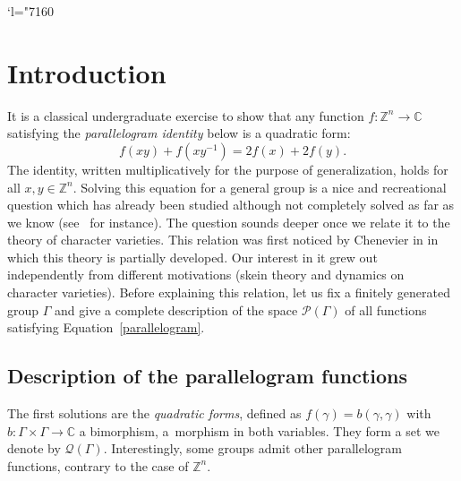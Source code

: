 \documentclass[JEP,XML,SOM,Unicode,NoEqCountersInSection]{cedram}
\let\mathcal\mathscr
\newcommand{\Changel}{\mathcode`l="7160}
\theoremstyle{definition}
\newcommand{\ZZ}{\mathbb{Z}}
\newcommand{\CC}{\mathbb{C}}
\begin{document}
\maketitle
\vspace*{-\baselineskip}
\tableofcontents
\mainmatter
\Changel

\section{Introduction}

It is a classical undergraduate
exercise to show that any function
$f:\ZZ^n\to \CC$ satisfying the {\em parallelogram identity} below is a quadratic form:
\begin{equation}\label{parallelogram}
f(xy)+f(xy^{-1})=2f(x)+2f(y).
\end{equation}
The identity, written multiplicatively for the purpose of generalization,
holds for all $x,y\in \ZZ^n$.
Solving this equation for a general group is a nice and recreational question
which has already been studied although not completely solved as far as
we know (see~\cite{FriisStetkaer} for instance).
The question sounds deeper once we relate it to the theory of character
varieties. This relation was first noticed by Chenevier in \cite{Chenevier}
in which this theory is partially developed.
Our interest in it grew out independently from
different motivations (skein theory and dynamics on character varieties).
Before explaining this relation, let us fix a finitely generated
group $\Gamma$ and give a complete description of the space
$\mathcal{P}(\Gamma)$ of all functions satisfying
Equation~\eqref{parallelogram}.

\subsection{Description of the parallelogram functions}\label{ssec:IntroDesc}

The first solutions are the {\em quadratic forms}, defined as
$f(\gamma)=b(\gamma,\gamma)$ with $b\colon\Gamma\times\Gamma\to\CC$
a bimorphism, \ie a~morphism in both variables.
They form a set we denote by
$\mathcal{Q}(\Gamma)$.
Interestingly, some groups admit other parallelogram functions,
contrary to the case of $\ZZ^n$.
\end{document}
